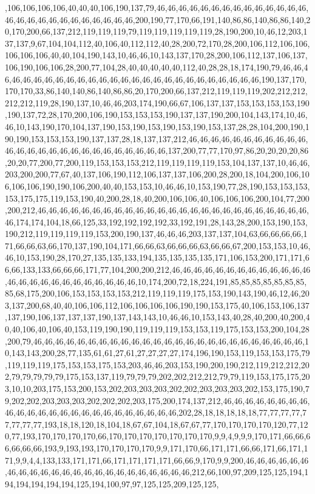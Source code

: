 ,106,106,106,106,40,40,40,106,190,137,79,46,46,46,46,46,46,46,46,46,46,46,46,46,46,46,46,46,46,46,46,46,46,46,46,46,46,200,190,77,170,66,191,140,86,86,140,86,86,140,20,170,200,66,137,212,119,119,119,79,119,119,119,119,119,28,190,200,10,46,12,203,137,137,9,67,104,104,112,40,106,40,112,112,40,28,200,72,170,28,200,106,112,106,106,106,106,106,40,40,104,190,143,10,46,46,10,143,137,170,28,200,106,112,137,106,137,106,190,106,106,28,200,77,104,28,40,40,40,40,40,112,40,28,28,18,174,190,79,46,46,46,46,46,46,46,46,46,46,46,46,46,46,46,46,46,46,46,46,46,46,46,46,46,46,190,137,170,170,170,33,86,140,140,86,140,86,86,20,170,200,66,137,212,119,119,119,202,212,212,212,212,119,28,190,137,10,46,46,203,174,190,66,67,106,137,137,153,153,153,153,190,190,137,72,28,170,200,106,190,153,153,153,190,137,137,190,200,104,143,174,10,46,46,10,143,190,170,104,137,190,153,190,153,190,153,190,153,137,28,28,104,200,190,190,190,153,153,153,190,137,137,28,18,137,137,212,46,46,46,46,46,46,46,46,46,46,46,46,46,46,46,46,46,46,46,46,46,46,46,46,46,46,137,200,77,77,170,97,86,20,20,20,20,86,20,20,77,200,77,200,119,153,153,153,212,119,119,119,119,153,104,137,137,10,46,46,203,200,200,77,67,40,137,106,190,112,106,137,137,106,200,28,200,18,104,200,106,106,106,106,190,190,106,200,40,40,153,153,10,46,46,10,153,190,77,28,190,153,153,153,153,175,175,119,153,190,40,200,28,18,40,200,106,106,40,106,106,106,200,104,77,200,200,212,46,46,46,46,46,46,46,46,46,46,46,46,46,46,46,46,46,46,46,46,46,46,46,46,46,46,174,174,104,18,66,125,33,192,192,192,192,33,192,191,28,143,28,200,153,190,153,190,212,119,119,119,119,153,200,190,137,46,46,46,203,137,137,104,63,66,66,66,66,171,66,66,63,66,170,137,190,104,171,66,66,63,66,66,66,63,66,66,67,200,153,153,10,46,46,10,153,190,28,170,27,135,135,133,194,135,135,135,135,171,106,153,200,171,171,66,66,133,133,66,66,66,171,77,104,200,200,212,46,46,46,46,46,46,46,46,46,46,46,46,46,46,46,46,46,46,46,46,46,46,46,46,46,10,174,200,72,18,224,191,85,85,85,85,85,85,85,85,68,175,200,106,153,153,153,153,212,119,119,119,175,153,190,143,190,46,12,46,203,137,200,68,40,40,106,106,112,106,106,106,106,190,190,153,175,40,106,153,106,137,137,190,106,137,137,137,190,137,143,143,10,46,46,10,153,143,40,28,40,200,40,200,40,40,106,40,106,40,153,119,190,190,119,119,119,153,153,119,175,153,153,200,104,28,200,79,46,46,46,46,46,46,46,46,46,46,46,46,46,46,46,46,46,46,46,46,46,46,46,46,46,10,143,143,200,28,77,135,61,61,27,61,27,27,27,27,174,196,190,153,119,153,153,175,79,119,119,119,175,153,153,175,153,203,46,46,203,153,190,200,190,212,119,212,212,202,79,79,79,79,79,175,153,137,119,79,79,79,202,202,212,212,79,79,119,153,175,175,203,10,10,203,175,153,200,153,202,203,203,203,202,202,203,203,203,202,153,175,190,79,202,202,203,203,203,202,202,202,203,175,200,174,137,212,46,46,46,46,46,46,46,46,46,46,46,46,46,46,46,46,46,46,46,46,46,46,46,46,202,28,18,18,18,18,18,77,77,77,77,77,77,77,77,193,18,18,120,18,104,18,67,67,104,18,67,67,77,170,170,170,170,120,77,120,77,193,170,170,170,170,66,170,170,170,170,170,170,170,9,9,4,9,9,9,170,171,66,66,66,66,66,66,193,9,193,193,170,170,170,170,9,9,171,170,66,171,171,66,66,171,66,171,171,9,9,4,4,133,133,171,171,66,171,171,171,171,66,66,9,170,9,9,200,46,46,46,46,46,46,46,46,46,46,46,46,46,46,46,46,46,46,46,46,46,46,46,212,66,100,97,209,125,125,194,194,194,194,194,194,125,194,100,97,97,125,125,209,125,125,
